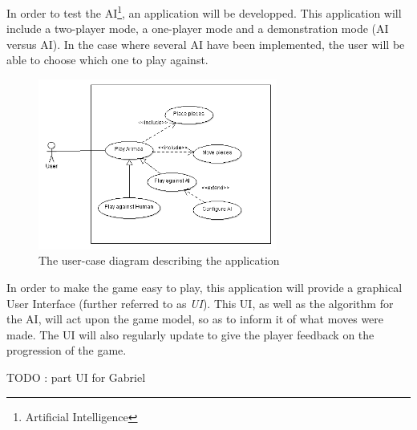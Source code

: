 In order to test the AI\footnote{Artificial Intelligence}, an application will be developped.
This application will include a two-player mode, a one-player mode and a demonstration mode (AI versus AI).
In the case where several AI have been implemented, the user will be able to choose which one to play against.

\begin{figure}[!h]
\centering
\includegraphics[width=0.7\textwidth]{2General_Architecture/2.1Behaviour_of_the_Game/Pictures/Application_UCD}
\caption{The user-case diagram describing the application}
\label{fig:pieces}
\end{figure}

In order to make the game easy to play, this application will provide a graphical User Interface (further referred to as \emph{UI}). %
This UI, as well as the algorithm for the AI, will act upon the game model, so as to inform it of what moves were made.
The UI will also regularly update to give the player feedback on the progression of the game.

TODO : part UI for Gabriel